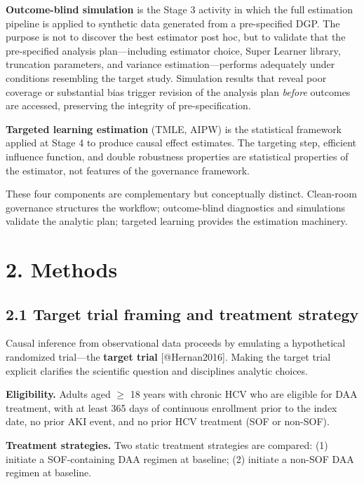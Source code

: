 \documentclass[
  letterpaper,
  DIV=11,
  numbers=noendperiod]{scrartcl}
\begin{document}
\textbf{Outcome-blind simulation} is the Stage 3 activity in which the
full estimation pipeline is applied to synthetic data generated from a
pre-specified DGP. The purpose is not to discover the best estimator
post hoc, but to validate that the pre-specified analysis
plan---including estimator choice, Super Learner library, truncation
parameters, and variance estimation---performs adequately under
conditions resembling the target study. Simulation results that reveal
poor coverage or substantial bias trigger revision of the analysis plan
\emph{before} outcomes are accessed, preserving the integrity of
pre-specification.

\textbf{Targeted learning estimation} (TMLE, AIPW) is the statistical
framework applied at Stage 4 to produce causal effect estimates. The
targeting step, efficient influence function, and double robustness
properties are statistical properties of the estimator, not features of
the governance framework.

These four components are complementary but conceptually distinct.
Clean-room governance structures the workflow; outcome-blind diagnostics
and simulations validate the analytic plan; targeted learning provides
the estimation machinery.

\section{2. Methods}\label{methods}

\subsection{2.1 Target trial framing and treatment
strategy}\label{target-trial-framing-and-treatment-strategy}

Causal inference from observational data proceeds by emulating a
hypothetical randomized trial---the \textbf{target trial}
{[}@Hernan2016{]}. Making the target trial explicit clarifies the
scientific question and disciplines analytic choices.

\textbf{Eligibility.} Adults aged \(\geq\) 18 years with chronic HCV who
are eligible for DAA treatment, with at least 365 days of continuous
enrollment prior to the index date, no prior AKI event, and no prior HCV
treatment (SOF or non-SOF).

\textbf{Treatment strategies.} Two static treatment strategies are
compared: (1) initiate a SOF-containing DAA regimen at baseline; (2)
initiate a non-SOF DAA regimen at baseline.
\end{document}
